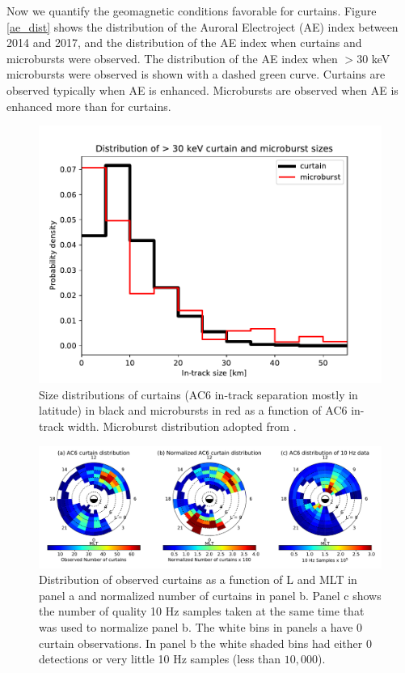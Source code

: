 \documentclass[draft]{agujournal2019}
\begin{document}
Now we quantify the geomagnetic conditions favorable for curtains. Figure \ref{ae_dist} shows the distribution of the Auroral Electroject (AE) index between 2014 and 2017, and the distribution of the AE index when curtains and microbursts were observed. The distribution of the AE index when $> 30$ keV microbursts were observed is shown with a dashed green curve. Curtains are observed typically when AE is enhanced. Microbursts are observed when AE is enhanced more than for curtains.

\begin{figure}
\includegraphics[width=\textwidth]{ac6_curtain_microburst_width_dist.pdf}
\caption{Size distributions of curtains (AC6 in-track separation mostly in latitude) in black and microbursts in red as a function of AC6 in-track width. Microburst distribution adopted from .}
\label{width_dist}
\end{figure}

\begin{figure}
\includegraphics[width=\textwidth]{fig2_2.pdf}
\caption{Distribution of observed curtains as a function of L and MLT in panel a and normalized number of curtains in panel b. Panel c shows the number of quality 10 Hz samples taken at the same time that was used to normalize panel b. The white bins in panels a have 0 curtain observations. In panel b the white shaded bins had either 0 detections or very little 10 Hz samples (less than $10,000$).}
\label{l_mlt_dist}
\end{figure}
\end{document}
